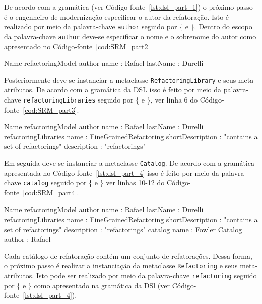 De acordo com a gramática (ver Código-fonte~\ref{lst:dsl_part_1}) o próximo passo é o engenheiro de modernização especificar o autor da refatoração. Isto é realizado por meio da palavra-chave \texttt{author} seguido por \{ e \}. Dentro do escopo da palavra-chave \texttt{author} deve-se especificar o nome e o sobrenome do autor como apresentado no Código-fonte~\ref{cod:SRM_part2}

\begin{codigo}[caption={[Exemplo de uso da DSL - parte 2.] Exemplo de uso da DSL - parte 2.},escapeinside={(*@}{@*)}, basicstyle=\footnotesize, label={cod:SRM_part2}, language=myDSL]{Name}
refactoringModel {
    author {
		name : Rafael
		lastName : Durelli
	}
}
\end{codigo}

Posteriormente deve-se instanciar a metaclasse \texttt{RefactoringLibrary} e seus meta-atributos. De acordo com a gramática da DSL isso é feito por meio da palavra-chave \texttt{refactoring\-Libraries} seguido por \{ e \}, ver linha 6 do Código-fonte~\ref{cod:SRM_part3}. 

\begin{codigo}[caption={[Exemplo de uso da DSL - parte 3.] Exemplo de uso da DSL - parte 3.},escapeinside={(*@}{@*)}, basicstyle=\footnotesize, label={cod:SRM_part3}, language=myDSL]{Name}
refactoringModel {
    author {
		name : Rafael
		lastName : Durelli
	}
	refactoringLibraries {
	    name : FineGrainedRefactoring
		shortDescription : "contains a set of refactorings"
		description : "refactorings"
	}
}
\end{codigo}

Em seguida deve-se instanciar a metaclasse \texttt{Catalog}. De acordo com a gramática apresentada no Código-fonte~\ref{lst:dsl_part_4} isso é feito por meio da palavra-chave \texttt{catalog} seguido por \{ e \} ver linhas 10-12 do Código-fonte~\ref{cod:SRM_part4}.

\begin{codigo}[caption={[Exemplo de uso da DSL - parte 4.] Exemplo de uso da DSL - parte 4.},escapeinside={(*@}{@*)}, basicstyle=\footnotesize, label={cod:SRM_part4}, language=myDSL]{Name}
refactoringModel {
    author {
		name : Rafael
		lastName : Durelli
	}
	refactoringLibraries {
	    name : FineGrainedRefactoring
		shortDescription : "contains a set of refactorings"
		description : "refactorings"
		catalog {
			name : Fowler Catalog
			author : Rafael
		}
	}
}
\end{codigo}

Cada catálogo de refatoração contém um conjunto de refatorações. Dessa forma, o próximo passo é realizar a instanciação da metaclasse \texttt{Refactoring} e seus meta-atributos. Isto pode ser realizado por meio da palavra-chave \texttt{refactoring} seguido por \{ e \} como apresentado na gramática da DSl (ver Código-fonte~\ref{lst:dsl_part_4}).

